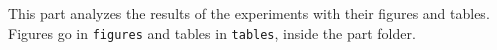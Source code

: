 
This part analyzes the results of the experiments with their figures and tables.
Figures go in \texttt{figures} and tables in \texttt{tables}, inside the part folder.
